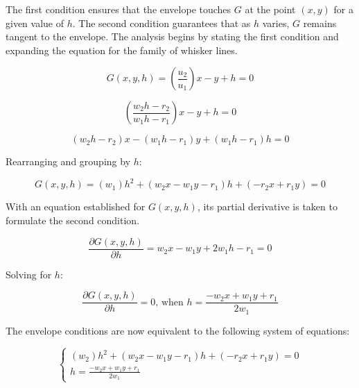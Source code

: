 \documentclass[11pt]{article}
\begin{document}
        The first condition ensures that the envelope touches $G$ at the point $(x,y)$ for a given value of $h$. The second condition guarantees that as $h$ varies, $G$ remains tangent to the envelope. The analysis begins by stating the first condition and expanding the equation for the family of whisker lines.
        
        \begin{equation}
          G(x,y,h) = \left(\frac{u_2}{u_1}\right) x - y + h = 0
          \label{eq:Eq35}
        \end{equation}
        
        \begin{equation}
          \left(\frac{w_2h-r_2}{w_1h-r_1}\right) x - y + h = 0
          \label{eq:Eq36}
        \end{equation}
        
        \begin{equation}
          (w_2h - r_2)x - (w_1h - r_1)y + (w_1h - r_1)h = 0
          \label{eq:Eq37}
        \end{equation}
    
        Rearranging and grouping by $h$: 
    
        \begin{equation}
          G(x,y,h) = (w_1)h^2 + (w_2x - w_1y - r_1)h + (-r_2x+r_1y) = 0
          \label{eq:Eq38}
        \end{equation}
    
        With an equation established for $G(x,y,h)$, its partial derivative is taken to formulate the second condition. 

        \begin{equation}
          \frac{\partial G(x,y,h)}{\partial{h}} = w_2x - w_1y + 2w_1h - r_1 = 0
          \label{eq:Eq39}
        \end{equation}
    
        Solving for $h$:
        
        \begin{equation}
          \frac{\partial G(x,y,h)}{\partial{h}} = 0 \text{, when } h=\frac{-w_2x + w_1y + r_1}{2w_1}
          \label{eq:Eq40}
        \end{equation}
    
        The envelope conditions are now equivalent to the following system of equations: 

        \begin{equation}
          \left\{
          \begin{array}{l}
            (w_2)h^2 + (w_2x - w_1y - r_1)h + (-r_2x + r_1y) = 0 \\
            h = \frac{-w_2x + w_1y + r_1}{2w_1}
          \end{array}
          \right.
          \label{eq:Eq41}
        \end{equation}
    
\end{document}

